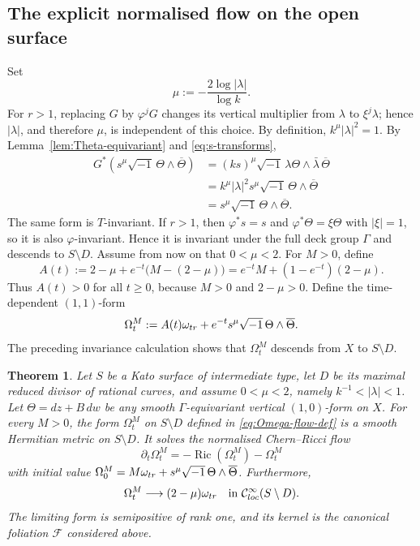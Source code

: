 \documentclass[10pt,a4paper]{amsart}
\numberwithin{equation}{section}
\newtheorem{theorem}{Theorem}
\begin{document}
\subsection{The explicit normalised flow on the open surface}

Set
\begin{equation}\label{eq:mu-def}
 \mu:=-\frac{2\log|\lambda|}{\log k}.
\end{equation}
For $r>1$, replacing $G$ by $\varphi^jG$ changes its vertical multiplier from $\lambda$ to $\xi^j\lambda$; hence $|\lambda|$, and therefore $\mu$, is independent of this choice. By definition, $k^\mu|\lambda|^2=1$.
By Lemma~\ref{lem:Theta-equivariant} and \eqref{eq:s-transforms},
\begin{align*}
 G^*\left(s^\mu\sqrt{-1}\,\Theta\wedge\overline\Theta\right)
 &=
 (ks)^\mu\sqrt{-1}\,\lambda\Theta\wedge
 \bar\lambda\,\overline\Theta \\
 &=
 k^\mu|\lambda|^2s^\mu
 \sqrt{-1}\,\Theta\wedge\overline\Theta \\
 &=
 s^\mu\sqrt{-1}\,\Theta\wedge\overline\Theta.
\end{align*}
The same form is $T$-invariant. If $r>1$, then $\varphi^*s=s$ and $\varphi^*\Theta=\xi\Theta$ with $|\xi|=1$, so it is also $\varphi$-invariant. Hence it is invariant under the full deck group $\Gamma$ and descends to $S\setminus D$.
Assume from now on that $0<\mu<2$. For $M>0$, define
$$
A(t):=2-\mu+e^{-t}\bigl(M-(2-\mu)\bigr)=e^{-t}M+(1-e^{-t})(2-\mu).
$$
Thus $A(t)>0$ for all $t\geq0$, because $M>0$ and $2-\mu>0$.
Define the time-dependent $(1,1)$-form
\begin{equation}\label{eq:Omega-flow-def}
 \Omega_t^M
 :=
 A(t)\omega_{\rm tr}
 +
 e^{-t}s^\mu\sqrt{-1}\,\Theta\wedge\overline\Theta.
\end{equation}
The preceding invariance calculation shows that $\Omega_t^M$ descends from
$X$ to $S\setminus D$.



\begin{theorem}\label{thm:main-open-flow}
Let $S$ be a Kato surface of intermediate type, let $D$ be its maximal reduced divisor of rational curves, and assume $0<\mu<2$,  namely $k^{-1}<|\lambda|<1$.
Let $\Theta=dz+B\,dw$ be any
smooth $\Gamma$-equivariant vertical $(1,0)$-form on $X$. 
For every $M>0$, the form $\Omega_t^M$ on $S\setminus D$ defined in \eqref{eq:Omega-flow-def} is a smooth Hermitian metric on $S\setminus D$. It solves the normalised Chern--Ricci flow
\begin{equation*}
 \partial_t\Omega_t^M=-\operatorname{Ric}(\Omega_t^M)-\Omega_t^M
\end{equation*}
with initial value $\Omega_0^M = M\omega_{\rm tr} + s^\mu\sqrt{-1}\,\Theta\wedge\overline\Theta$.
Furthermore,
\begin{equation*}
 \Omega_t^M
 \longrightarrow
 (2-\mu)\omega_{\rm tr}
 \quad
 \text{in } \mathcal C^\infty_{\rm loc}(S\setminus D).
\end{equation*}
The limiting form is semipositive of rank one, and its kernel is the canonical foliation $\mathcal F$ considered above.
\end{theorem}
\end{document}
